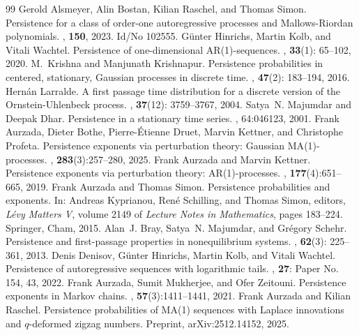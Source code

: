 \documentclass[10pt,a4paper]{amsart}
\newcommand{\1}{\mathds{1}}
\begin{document}
\begin{thebibliography}{99}
 Gerold Alsmeyer, Alin Bostan, Kilian Raschel, and Thomas Simon. \newblock Persistence for a class of order-one autoregressive processes and {Mallows}-{Riordan} polynomials. , {\bf 150}, 2023. \newblock Id/No 102555. %
 G{\"u}nter Hinrichs, Martin Kolb, and Vitali Wachtel. \newblock Persistence of one-dimensional {AR}(1)-sequences. , {\bf 33}(1): 65--102, 2020.
 M.~Krishna and Manjunath Krishnapur. \newblock Persistence probabilities in centered, stationary, {Gaussian} processes in discrete time. , {\bf 47}(2): 183--194, 2016.
 Hern\'an Larralde. \newblock A first passage time distribution for a discrete version of the {O}rnstein-{U}hlenbeck process. , {\bf 37}(12): 3759--3767, 2004.
 Satya~N. Majumdar and Deepak Dhar. \newblock Persistence in a stationary time series. , 64:046123, 2001.
 Frank Aurzada, Dieter Bothe, Pierre-\'Etienne Druet, Marvin Kettner, and Christophe Profeta. \newblock Persistence exponents via perturbation theory: {G}aussian {MA}(1)-processes. , {\bf 283}(3):257--280, 2025.
 Frank Aurzada and Marvin Kettner. \newblock Persistence exponents via perturbation theory: {AR}(1)-processes. , {\bf 177}(4):651--665, 2019.
 Frank Aurzada and Thomas Simon. \newblock Persistence probabilities and exponents. \newblock In: Andreas Kyprianou, Ren{\'e} Schilling, and Thomas Simon, editors, {\em L\'evy Matters V}, volume 2149 of {\em Lecture Notes in Mathematics}, pages 183--224. Springer, Cham, 2015.
 Alan~J. Bray, Satya~N. Majumdar, and Gr{\'e}gory Schehr. \newblock Persistence and first-passage properties in nonequilibrium systems. , {\bf 62}(3): 225--361, 2013.
 Denis Denisov, G\"unter Hinrichs, Martin Kolb, and Vitali Wachtel. \newblock Persistence of autoregressive sequences with logarithmic tails. , {\bf 27}: Paper No. 154, 43, 2022.
 Frank Aurzada, Sumit Mukherjee, and Ofer Zeitouni. \newblock Persistence exponents in {Markov} chains. , {\bf 57}(3):1411--1441, 2021.
 Frank Aurzada and Kilian Raschel. \newblock Persistence probabilities of {MA}(1) sequences with {L}aplace innovations and $q$-deformed zigzag numbers. \newblock Preprint, arXiv:2512.14152, 2025.

\end{thebibliography}
\end{document}
